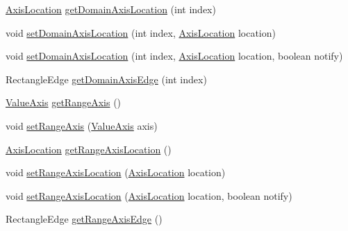 \begin{DoxyCompactItemize}
\item 
\mbox{\hyperlink{classorg_1_1jfree_1_1chart_1_1axis_1_1_axis_location}{Axis\+Location}} \mbox{\hyperlink{classorg_1_1jfree_1_1chart_1_1plot_1_1_x_y_plot_adb9a01f67817531cfb75036a3c2c2df4}{get\+Domain\+Axis\+Location}} (int index)
\item 
void \mbox{\hyperlink{classorg_1_1jfree_1_1chart_1_1plot_1_1_x_y_plot_a67b3006bc00270da79f919e2970523c0}{set\+Domain\+Axis\+Location}} (int index, \mbox{\hyperlink{classorg_1_1jfree_1_1chart_1_1axis_1_1_axis_location}{Axis\+Location}} location)
\item 
void \mbox{\hyperlink{classorg_1_1jfree_1_1chart_1_1plot_1_1_x_y_plot_ac86ea54d796fda545caf8957bdc066f9}{set\+Domain\+Axis\+Location}} (int index, \mbox{\hyperlink{classorg_1_1jfree_1_1chart_1_1axis_1_1_axis_location}{Axis\+Location}} location, boolean notify)
\item 
Rectangle\+Edge \mbox{\hyperlink{classorg_1_1jfree_1_1chart_1_1plot_1_1_x_y_plot_a24041c33028c5423553b1953ca9fb017}{get\+Domain\+Axis\+Edge}} (int index)
\item 
\mbox{\hyperlink{classorg_1_1jfree_1_1chart_1_1axis_1_1_value_axis}{Value\+Axis}} \mbox{\hyperlink{classorg_1_1jfree_1_1chart_1_1plot_1_1_x_y_plot_ae0fb9228ae5f8d5019fe6bdbe5f2807e}{get\+Range\+Axis}} ()
\item 
void \mbox{\hyperlink{classorg_1_1jfree_1_1chart_1_1plot_1_1_x_y_plot_ad1e4454ba3a7289dd46f705fbd0db983}{set\+Range\+Axis}} (\mbox{\hyperlink{classorg_1_1jfree_1_1chart_1_1axis_1_1_value_axis}{Value\+Axis}} axis)
\item 
\mbox{\hyperlink{classorg_1_1jfree_1_1chart_1_1axis_1_1_axis_location}{Axis\+Location}} \mbox{\hyperlink{classorg_1_1jfree_1_1chart_1_1plot_1_1_x_y_plot_a6fb19e12902c04095a10b90a2c22dc05}{get\+Range\+Axis\+Location}} ()
\item 
void \mbox{\hyperlink{classorg_1_1jfree_1_1chart_1_1plot_1_1_x_y_plot_ae3d54bdb3cf80b88fe249e455f894475}{set\+Range\+Axis\+Location}} (\mbox{\hyperlink{classorg_1_1jfree_1_1chart_1_1axis_1_1_axis_location}{Axis\+Location}} location)
\item 
void \mbox{\hyperlink{classorg_1_1jfree_1_1chart_1_1plot_1_1_x_y_plot_ab13f40394bf3637080dc38da7209d29f}{set\+Range\+Axis\+Location}} (\mbox{\hyperlink{classorg_1_1jfree_1_1chart_1_1axis_1_1_axis_location}{Axis\+Location}} location, boolean notify)
\item 
Rectangle\+Edge \mbox{\hyperlink{classorg_1_1jfree_1_1chart_1_1plot_1_1_x_y_plot_afedfdcd95acbad44c695f54697beeb09}{get\+Range\+Axis\+Edge}} ()

\end{DoxyCompactItemize}
